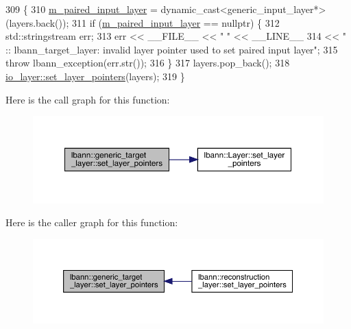 \begin{DoxyCode}
309                                                              \{
310     \hyperlink{classlbann_1_1generic__target__layer_a84da1260e9feb4fbc3e6f2315e4cab4b}{m\_paired\_input\_layer} = \textcolor{keyword}{dynamic\_cast<}generic\_input\_layer*\textcolor{keyword}{>}(layers.back());
311     \textcolor{keywordflow}{if} (\hyperlink{classlbann_1_1generic__target__layer_a84da1260e9feb4fbc3e6f2315e4cab4b}{m\_paired\_input\_layer} == \textcolor{keyword}{nullptr}) \{
312       std::stringstream err;
313       err << \_\_FILE\_\_ << \textcolor{stringliteral}{" "} << \_\_LINE\_\_
314           << \textcolor{stringliteral}{" :: lbann\_target\_layer: invalid layer pointer used to set paired input layer"};
315       \textcolor{keywordflow}{throw} lbann\_exception(err.str());
316     \}
317     layers.pop\_back();
318     \hyperlink{classlbann_1_1Layer_a001ea76cdd05e2d0d475f408f24702ee}{io\_layer::set\_layer\_pointers}(layers);
319   \}
\end{DoxyCode}
Here is the call graph for this function\+:\nopagebreak
\begin{figure}[H]
\begin{center}
\leavevmode
\includegraphics[width=350pt]{classlbann_1_1generic__target__layer_a1f8f722fadb1223b063c0917afd83b66_cgraph}
\end{center}
\end{figure}
Here is the caller graph for this function\+:\nopagebreak
\begin{figure}[H]
\begin{center}
\leavevmode
\includegraphics[width=350pt]{classlbann_1_1generic__target__layer_a1f8f722fadb1223b063c0917afd83b66_icgraph}
\end{center}
\end{figure}
\mbox{\label{classlbann_1_1generic__target__layer_ab1bf1a639db82f2dd6ef3994f2269ec2}} 
